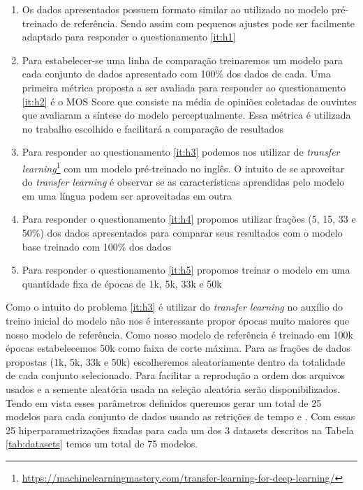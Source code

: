 \documentclass{article}
\begin{document}
\begin{enumerate}
	\item Os dados apresentados possuem formato similar ao utilizado no modelo pré-treinado de referência. 
	Sendo assim com pequenos ajustes pode ser facilmente adaptado para responder o questionamento \ref{it:h1}
	\item Para estabelecer-se uma linha de comparação treinaremos um modelo para cada conjunto de dados apresentado com 100\% dos dados de cada.
	Uma primeira métrica proposta a ser avaliada para responder ao questionamento \ref{it:h2} é o MOS Score que consiste na média de opiniões coletadas de ouvintes que avaliaram a síntese do modelo perceptualmente.
	Essa métrica é utilizada no trabalho escolhido e facilitará a comparação de resultados
	\item Para responder ao questionamento \ref{it:h3} podemos nos utilizar de \textit{transfer learning}\footnote{\url{https://machinelearningmastery.com/transfer-learning-for-deep-learning/}} com um modelo pré-treinado no inglês.
	O intuito de se aproveitar do \textit{transfer learning} é observar se as características aprendidas pelo modelo em uma língua podem ser aproveitadas em outra
	\item Para responder o questionamento \ref{it:h4} propomos utilizar frações (5, 15, 33 e 50\%) dos dados apresentados para comparar seus resultados com o modelo base treinado com 100\% dos dados
	\item Para responder o questionamento \ref{it:h5} propomos treinar o modelo em uma quantidade fixa de épocas de 1k, 5k, 33k e 50k
\end{enumerate}

Como o intuito do problema \ref{it:h3} é utilizar do \textit{transfer learning} no auxílio do treino inicial do modelo não nos é interessante propor épocas muito maiores que nosso modelo de referência. 
Como nosso modelo de referência é treinado em 100k épocas estabelecemos 50k como faixa de corte máxima. 
Para as frações de dados propostas (1k, 5k, 33k e 50k) escolheremos aleatoriamente dentro da totalidade de cada conjunto selecionado.
Para facilitar a reprodução a ordem dos arquivos usados e a semente aleatória usada na seleção aleatória serão disponibilizados.
Tendo em vista esses parâmetros definidos queremos gerar um total de 25 modelos para cada conjunto de dados usando as retrições de tempo e .
Com essas 25 hiperparametrizações fixadas para cada um dos 3 datasets descritos na Tabela \ref{tab:datasets} temos um total de 75 modelos. 
\end{document}
